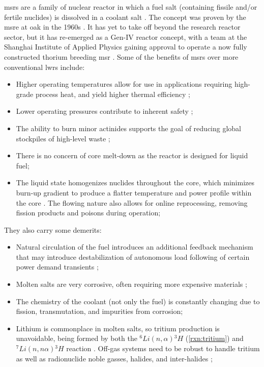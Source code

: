 \acfp{msr} are a family of nuclear reactor in which a fuel salt (containing fissile and/or fertile nuclides) is dissolved in a coolant salt \cite{RoperOverview}. The concept was proven by the \acf{msre} at \acf{oak} in the 1960s \cite{MSRE}. It has yet to take off beyond the research reactor sector, but it has re-emerged as a Gen-IV reactor concept, with a team at the Shanghai Institute of Applied Physics gaining approval to operate a now fully constructed thorium breeding \acs{msr} \cite{china}. Some of the benefits of \acsp{msr} over more conventional \acsp{lwr} include:
\begin{itemize}
    \item Higher operating temperatures allow for use in applications requiring high-grade process heat, and yield higher thermal efficiency \cite{RoperOverview};
    \item Lower operating pressures contribute to inherent safety \cite{RoperReview};
    \item The ability to burn minor actinides supports the goal of reducing global stockpiles of high-level waste \cite{RoperReview};
    \item There is no concern of core melt-down as the reactor is designed for liquid fuel;
    \item The liquid state homogenizes nuclides throughout the core, which minimizes burn-up gradient to produce a flatter temperature and power profile within the core \cite[Ch. 3]{TodreasKazimi1}. The flowing nature also allows for online reprocessing, removing fission products and poisons during operation;
\end{itemize}

They also carry some demerits:
\begin{itemize}
    \item Natural circulation of the fuel introduces an additional feedback mechanism that may introduce destabilization of autonomous load following of certain power demand transients \cite{CarterNumerical};
    \item Molten salts are very corrosive, often requiring more expensive materials \cite{RoperRedox};
    \item The chemistry of the coolant (not only the fuel) is constantly changing due to fission, transmutation, and impurities from corrosion;
    \item Lithium is commonplace in molten salts, so tritium production is unavoidable, being formed by both the $^{6}Li(n,\alpha){^{3}H}$ (\ref{rxn:tritium}) and $^{7}Li(n,n\alpha){^{3}H}$ reaction . Off-gas systems need to be robust to handle tritium as well as radionuclide noble gasses, halides, and inter-halides \cite{HolcombOffgas};
\end{itemize}

